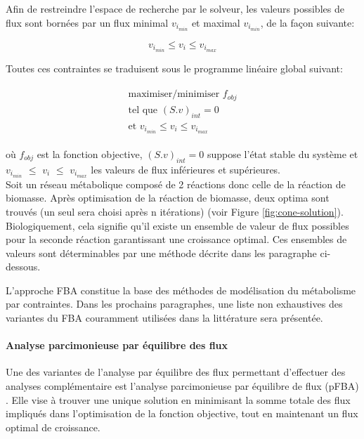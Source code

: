 \documentclass[../main.tex]{subfiles}
\begin{document}
Afin de restreindre l'espace de recherche par le solveur, les valeurs possibles de flux sont bornées par un flux minimal $v_{i_{min}}$ et maximal $v_{i_{min}}$, de la façon suivante:

\begin{equation}
 \text{$v_{i_{min}}$} \leq v_i \leq \text{$v_{i_{max}}$}
\end{equation}

Toutes ces contraintes se traduisent sous le programme linéaire global suivant:

\begin{align}
\begin{split}
\label{lineaire}
    \text{maximiser/minimiser }\text{$f_{obj}$} \\
    \text{tel que } (S.v)_{int} = 0\\
    \text{et } \text{$v_{i_{min}}$} \leq v_i \leq \text{$v_{i_{max}}$}
\end{split}
\end{align}

où $f_{obj}$ est la fonction objective, $(S.v)_{int} = 0$ suppose l'état stable du système et $v_{i_{min}}$ $\leq$ $v_i$ $\leq$ $v_{i_{max}}$ les valeurs de flux inférieures et supérieures. \citep{Orth2010}\\

Soit un réseau métabolique composé de 2 réactions donc celle de la réaction de biomasse. Après optimisation de la réaction de biomasse, deux optima sont trouvés (un seul sera choisi après n itérations) (voir Figure \ref{fig:cone-solution}). Biologiquement, cela signifie qu'il existe un ensemble de valeur de flux possibles pour la seconde réaction garantissant une croissance optimal. Ces ensembles de valeurs sont déterminables par une méthode décrite dans les paragraphe ci-dessous.

L'approche FBA constitue la base des méthodes de modélisation du métabolisme par contraintes. Dans les prochains paragraphes, une liste non exhaustives des variantes du FBA couramment utilisées dans la littérature sera présentée.


\paragraph*{Analyse parcimonieuse par équilibre des flux}
Une des variantes de l'analyse par équilibre des flux permettant d'effectuer des analyses complémentaire est l'analyse parcimonieuse par équilibre de flux  (pFBA) \citep{Lewis2010}. Elle vise à trouver une unique solution en minimisant la somme totale des flux impliqués dans l'optimisation de la fonction objective, tout en maintenant un flux optimal de croissance.
\end{document}
